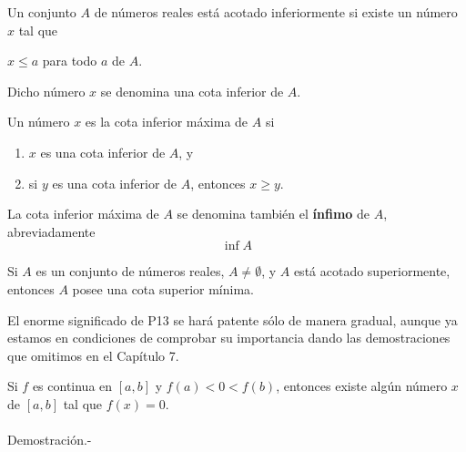 \begin{tcolorbox}
    \begin{def.}
	Un conjunto $A$ de números reales está acotado inferiormente si existe un número $x$ tal que
	\begin{center}
	    $x\leq a$ para todo $a$ de $A$.
	\end{center}
	Dicho número $x$ se denomina una cota inferior de $A$.
    \end{def.}
\end{tcolorbox}

\begin{tcolorbox}
    \begin{def.}
	Un número $x$ es la cota inferior máxima de $A$ si
	\begin{enumerate}[\bfseries (1)]
	    \item $x$ es una cota inferior de $A$, y
	    \item si $y$ es una cota inferior de $A$, entonces $x\geq y$.
	\end{enumerate}
	La cota inferior máxima de $A$ se denomina también el \textbf{ínfimo} de $A$, abreviadamente
	$$\inf A$$
    \end{def.}
\end{tcolorbox}

\begin{tcolorbox}
\begin{prop}
    Si $A$ es un conjunto de números reales, $A\neq \emptyset$, y $A$ está acotado superiormente, entonces $A$ posee una cota superior mínima. 
\end{prop}
\end{tcolorbox}

El enorme significado de P13 se hará patente sólo de manera gradual, aunque ya estamos en condiciones de comprobar su importancia dando las demostraciones que omitimos en el Capítulo 7.\\


\setcounter{chapter}{7}
\setcounter{teo}{0}
\begin{teo}
    Si $f$ es continua en $[a,b]$ y $f(a)<0<f(b)$, entonces existe algún número $x$ de $[a,b]$ tal que $f(x)=0.$\\\\
	Demostración.-\; 
\end{teo}

\setcounter{chapter}{8}
\setcounter{teo}{0}

\begin{teo}
\end{teo}
